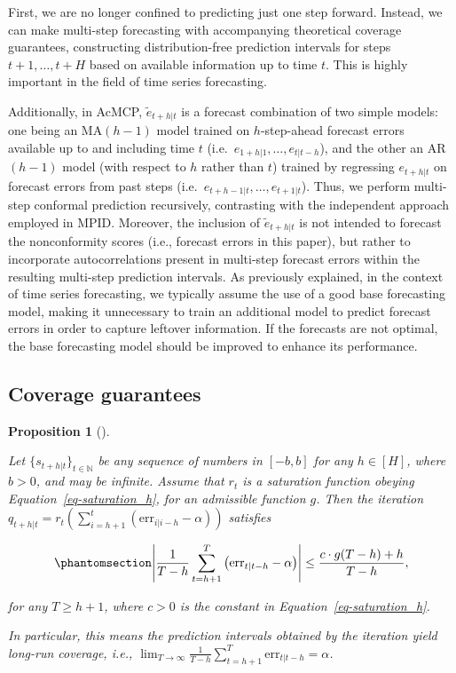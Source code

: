 \documentclass[
  11pt,
  a4paper,
]{article}
\theoremstyle{plain}
\newtheorem{proposition}{Proposition}[section]
\theoremstyle{remark}
\begin{document}
First, we are no longer confined to predicting just one step forward.
Instead, we can make multi-step forecasting with accompanying
theoretical coverage guarantees, constructing distribution-free
prediction intervals for steps \(t+1,\ldots,t+H\) based on available
information up to time \(t\). This is highly important in the field of
time series forecasting.

Additionally, in AcMCP, \(\tilde{e}_{t+h|t}\) is a forecast combination
of two simple models: one being an MA\((h-1)\) model trained on
\(h\)-step-ahead forecast errors available up to and including time
\(t\) (i.e.~\(e_{1+h|1}, \ldots, e_{t|t-h}\)), and the other an
AR\((h-1)\) model (with respect to \(h\) rather than \(t\)) trained by
regressing \(e_{t+h|t}\) on forecast errors from past steps
(i.e.~\(e_{t+h-1|t}, \ldots, e_{t+1|t}\)). Thus, we perform multi-step
conformal prediction recursively, contrasting with the independent
approach employed in MPID. Moreover, the inclusion of
\(\tilde{e}_{t+h|t}\) is not intended to forecast the nonconformity
scores (i.e., forecast errors in this paper), but rather to incorporate
autocorrelations present in multi-step forecast errors within the
resulting multi-step prediction intervals. As previously explained, in
the context of time series forecasting, we typically assume the use of a
good base forecasting model, making it unnecessary to train an
additional model to predict forecast errors in order to capture leftover
information. If the forecasts are not optimal, the base forecasting
model should be improved to enhance its performance.

\subsection{Coverage guarantees}\label{coverage-guarantees}

\begin{proposition}[]\protect\hypertarget{prp-cov_rt}{}\label{prp-cov_rt}

Let \(\{s_{t+h|t}\}_{t\in\mathbb{N}}\) be any sequence of numbers in
\([-b, b]\) for any \(h\in[H]\), where \(b>0\), and may be infinite.
Assume that \(r_t\) is a saturation function obeying
Equation~\ref{eq-saturation_h}, for an admissible function \(g\). Then
the iteration
\(q_{t+h|t}=r_t\left(\sum_{i=h+1}^t\left(\mathrm{err}_{i|i-h}-\alpha\right)\right)\)
satisfies

\begin{equation}\phantomsection\label{eq-cov_rt}{
\left|\frac{1}{T-h}\sum_{t=h+1}^{T}\left(\mathrm{err}_{t|t-h}-\alpha\right)\right| \leq \frac{c \cdot g(T-h) + h}{T-h},
}\end{equation}

for any \(T \geq h+1\), where \(c>0\) is the constant in
Equation~\ref{eq-saturation_h}.

In particular, this means the prediction intervals obtained by the
iteration yield long-run coverage, i.e.,
\(\lim _{T \rightarrow \infty} \frac{1}{T-h} \sum_{t=h+1}^T \mathrm{err}_{t|t-h} = \alpha\).

\end{proposition}
\end{document}
